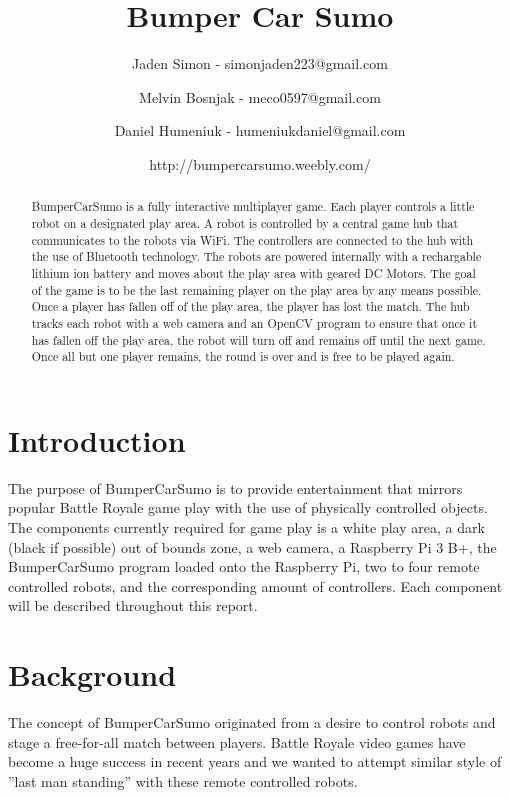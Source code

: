 \documentclass[11pt]{ieeeconf}
\title{Bumper Car Sumo}
\author{Jaden Simon - simonjaden223@gmail.com \\ \and
	   Melvin Bosnjak - meco0597@gmail.com \\ \and
	   Daniel Humeniuk - humeniukdaniel@gmail.com \\ \and
	   http://bumpercarsumo.weebly.com/}
\begin{document}
\maketitle

\begin{abstract}
BumperCarSumo is a fully interactive multiplayer game. Each player controls a little robot on a designated play area. A robot is controlled by a central game hub that communicates to the robots via WiFi. The controllers are connected to the hub with the use of Bluetooth technology. The robots are powered internally with a rechargable lithium ion battery and moves about the play area with geared DC Motors. The goal of the game is to be the last remaining player on the play area by any means possible. Once a player has fallen off of the play area, the player has lost the match. The hub tracks each robot with a web camera and an OpenCV program to ensure that once it has fallen off the play area, the robot will turn off and remains off until the next game. Once all but one player remains, the round is over and is free to be played again.
\end{abstract}

\section{Introduction}
The purpose of BumperCarSumo is to provide entertainment that mirrors popular Battle Royale game play with the use of physically controlled objects. The components currently required for game play is a white play area, a dark (black if possible) out of bounds zone, a web camera, a Raspberry Pi 3 B+, the BumperCarSumo program loaded onto the Raspberry Pi, two to four remote controlled robots, and the corresponding amount of controllers. Each component will be described throughout this report. 

\section{Background}


The concept of BumperCarSumo originated from a desire to control robots and stage a free-for-all match between players. Battle Royale video games have become a huge success in recent years and we wanted to attempt similar style of ''last man standing'' with these remote controlled robots.
\end{document}
